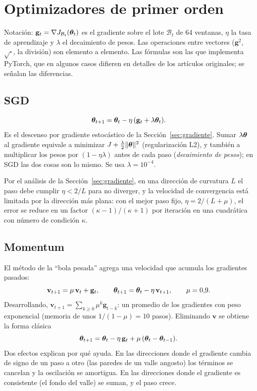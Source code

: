\section{Optimizadores de primer orden}
\label{sec:optimizadores}

Notación: $\mathbf{g}_t = \nabla J_{\mathcal{B}_t}(\boldsymbol{\theta}_t)$ es el gradiente sobre el lote $\mathcal{B}_t$ de 64 ventanas, $\eta$ la
tasa de aprendizaje y $\lambda$ el decaimiento de pesos. Las operaciones entre vectores ($\mathbf{g}^2$, $\sqrt{\cdot}$, la
división) son elemento a elemento. Las fórmulas son las que implementa PyTorch, que en algunos casos difieren en detalles de
los artículos originales; se señalan las diferencias.

\subsection{SGD}

\begin{equation}
  \boldsymbol{\theta}_{t+1} = \boldsymbol{\theta}_t - \eta\,(\mathbf{g}_t + \lambda\boldsymbol{\theta}_t).
  \label{eq:sgd}
\end{equation}
Es el descenso por gradiente estocástico de la Sección~\ref{sec:gradiente}. Sumar $\lambda\boldsymbol{\theta}$ al gradiente equivale a
minimizar $J + \frac{\lambda}{2}\lVert\boldsymbol{\theta}\rVert^2$ (regularización L2), y también a multiplicar los pesos por $(1 - \eta\lambda)$
antes de cada paso (\emph{decaimiento de pesos}); en SGD las dos cosas son lo mismo. Se usa $\lambda = 10^{-4}$.

Por el análisis de la Sección~\ref{sec:gradiente}, en una dirección de curvatura $L$ el paso debe cumplir $\eta < 2/L$ para no
diverger, y la velocidad de convergencia está limitada por la dirección más plana: con el mejor paso fijo,
$\eta = 2/(L + \mu)$, el error se reduce en un factor $(\kappa - 1)/(\kappa + 1)$ por iteración en una cuadrática con número de
condición $\kappa$.

\subsection{Momentum \parencite{polyak1964}}

El método de la ``bola pesada'' agrega una velocidad que acumula los gradientes pasados:
\begin{equation}
  \mathbf{v}_{t+1} = \mu\,\mathbf{v}_t + \mathbf{g}_t, \qquad \boldsymbol{\theta}_{t+1} = \boldsymbol{\theta}_t - \eta\,\mathbf{v}_{t+1},
  \qquad \mu = 0{,}9.
  \label{eq:momentum}
\end{equation}
Desarrollando, $\mathbf{v}_{t+1} = \sum_{k \ge 0}\mu^k\mathbf{g}_{t-k}$: un promedio de los gradientes con peso exponencial (memoria
de unos $1/(1-\mu) = 10$ pasos). Eliminando $\mathbf{v}$ se obtiene la forma clásica
\begin{equation}
  \boldsymbol{\theta}_{t+1} = \boldsymbol{\theta}_t - \eta\,\mathbf{g}_t + \mu\,(\boldsymbol{\theta}_t - \boldsymbol{\theta}_{t-1}).
  \label{eq:heavy_ball}
\end{equation}
Dos efectos explican por qué ayuda. En las direcciones donde el gradiente cambia de signo de un paso a otro (las paredes de
un valle angosto) los términos se cancelan y la oscilación se amortigua. En las direcciones donde el gradiente es
consistente (el fondo del valle) se suman, y el paso crece.

